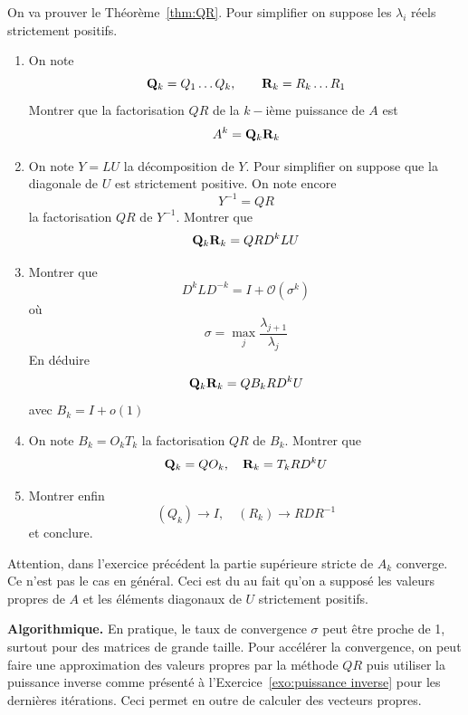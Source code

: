 \begin{exercice}[long]
On va prouver le Théorème~\ref{thm:QR}. Pour simplifier on suppose les $\lambda_i$ réels strictement positifs. 
\begin{enumerate}
\item On note
\[
\mathbf{Q}_k = Q_1 \dots Q_k, \qquad \mathbf{R}_k = R_k \dots R_1
\]
Montrer que la factorisation $QR$ de la $k-$ième puissance de $A$ est 
\[
A^k = \mathbf{Q}_k \mathbf{R}_k
\]
\item On note $Y = LU$ la décomposition de $Y$. Pour simplifier on suppose que la diagonale de $U$ est strictement positive. On note encore
\[
Y^{-1} = QR
\]
la factorisation $QR$ de $Y^{-1}$. Montrer que 
\[
\mathbf{Q}_k \mathbf{R}_k = QR D^k L U
\]
\item Montrer que 
\[
D^k L D^{-k} = I +  \mathcal O \left(\sigma^k\right)
\]
où 
\[
\sigma = \max_j \frac{\lambda_{j+1}}{\lambda_j}
\]
En déduire
\[
\mathbf{Q}_k \mathbf{R}_k = QB_k R D^k U
\]
avec $B_k = I + o(1)$
\item On note $B_k = O_kT_k$ la factorisation $QR$ de $B_k$. Montrer que 
\[
\mathbf{Q}_k = Q O_k, \quad \mathbf{R}_k = T_k R D^k U
\]
\item Montrer enfin
\[
(Q_k) \rightarrow I, \quad (R_k) \rightarrow R D R^{-1}
\]
et conclure.
\end{enumerate}
\end{exercice}

\begin{remark}
Attention, dans l'exercice précédent la partie supérieure stricte de $A_k$ converge. Ce n'est pas le cas en général. Ceci est du au fait qu'on a supposé les valeurs propres de $A$ et les éléments diagonaux de $U$ strictement positifs. 
\end{remark}

{\bf Algorithmique.}
En pratique, le taux de convergence $\sigma$ peut être proche de 1, surtout
pour des matrices de grande taille. Pour accélérer la convergence, on peut
faire une approximation des valeurs propres par la méthode $QR$ puis utiliser
la puissance inverse comme présenté à l'Exercice~\ref{exo:puissance inverse}
pour les dernières itérations. Ceci permet en outre de calculer des vecteurs
propres.

